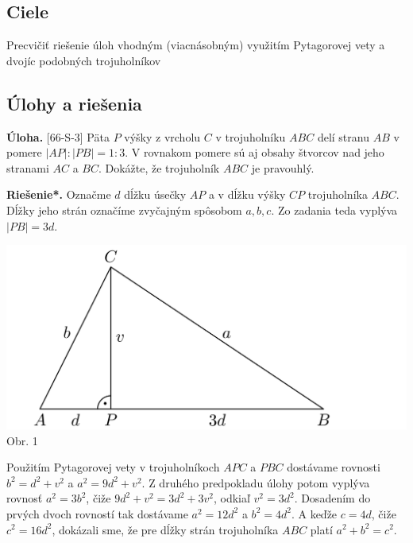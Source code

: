 \documentclass[11pt,a4paper,oneside,final]{book}
\newcommand{\ul}{\textbf{Úloha.} }
\newcommand{\rieh}{\textbf{Riešenie*.} }
\begin{document}
\subsection*{Ciele}
Precvičiť riešenie úloh vhodným (viacnásobným) využitím Pytagorovej vety a dvojíc podobných trojuholníkov

\subsection*{Úlohy a riešenia}
\begin{tcolorbox}[breakable,notitle,boxrule=0pt,colback=light-gray,colframe=light-gray]\ul [66-S-3] Päta $P$ výšky z vrcholu $C$ v trojuholníku $ABC$ delí stranu $AB$ v pomere $|AP| : |PB|= 1 : 3$. V rovnakom pomere sú aj obsahy štvorcov nad jeho stranami $AC$ a $BC$.
Dokážte, že trojuholník $ABC$ je pravouhlý.
\end{tcolorbox}

\rieh Označme $d$ dĺžku úsečky $AP$ a v dĺžku výšky $CP$ trojuholníka $ABC$. Dĺžky jeho strán označíme zvyčajným spôsobom $a, b, c$. Zo zadania teda vyplýva $|PB| = 3d$.
\begin{center}
\includegraphics[scale=0.3]{66S3}\\

Obr. 1
\end{center}
Použitím Pytagorovej vety v trojuholníkoch $APC$ a $PBC$ dostávame rovnosti $b^2= d^2 +v^2$ a $a^2 = 9d^2 +v^2$. Z druhého predpokladu úlohy potom vyplýva rovnosť $a^2 = 3b^2$, čiže $9d^2 + v^2 = 3d^2 + 3v^2$, odkiaľ $v^2 = 3d^2$. Dosadením do prvých dvoch rovností tak dostávame $a^2 = 12d^2$ a $b^2 = 4d^2$. A keďže $c = 4d$, čiže $c^2 = 16d^2$, dokázali sme, že pre dĺžky strán trojuholníka $ABC$ platí $a^2 + b^2 = c^2$.
\end{document}
